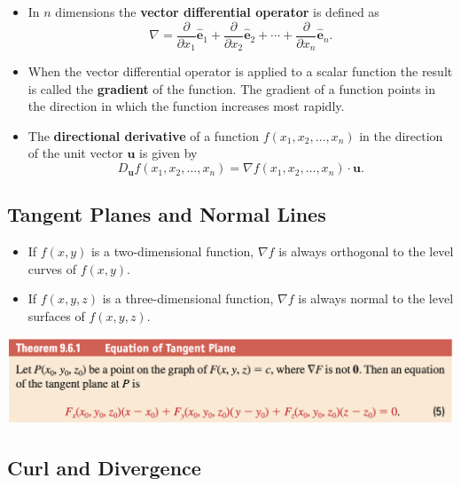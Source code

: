 \documentclass{article}
\begin{document}
\begin{itemize}
  \item In $n$ dimensions the \textbf{vector differential operator} is defined as \[\nabla = \frac{\partial}{\partial x_1} \hat{\mathbf{e}}_1 + \frac{\partial}{\partial x_2} \hat{\mathbf{e}}_2 + \cdots + \frac{\partial}{\partial x_n} \hat{\mathbf{e}}_n.\]

  \item When the vector differential operator is applied to a scalar function the result is called the \textbf{gradient} of the function. The gradient of a function points in the direction in which the function increases most rapidly.

  \item The \textbf{directional derivative} of a function $f(x_1, x_2, \ldots, x_n)$ in the direction of the unit vector $\mathbf{u}$ is given by \[D_\mathbf{u} f(x_1, x_2, \ldots, x_n) = \nabla f(x_1, x_2, \ldots, x_n) \cdot \mathbf{u}.\]
\end{itemize}

\subsection{Tangent Planes and Normal Lines}

\begin{itemize}
  \item If $f(x, y)$ is a two-dimensional function, $\nabla f$ is always orthogonal to the level curves of $f(x, y)$.

  \item If $f(x, y, z)$ is a three-dimensional function, $\nabla f$ is always normal to the level surfaces of $f(x, y, z)$.
\end{itemize}

\includegraphics[scale=0.443]{tangent-plane}

\subsection{Curl and Divergence}
\end{document}
